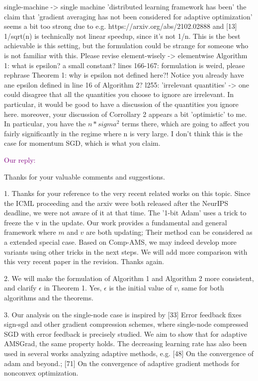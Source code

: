\documentclass{article}
\begin{document}
single-machine -> single machine
'distributed learning framework has been'
the claim that 'gradient averaging has not been considered for adaptive optimization' seems a bit too strong due to e.g. https://arxiv.org/abs/2102.02888 and [13]
1/sqrt(n) is technically not linear speedup, since it's not 1/n. This is the best achievable is this setting, but the formulation could be strange for someone who is not familiar with this. Please revise
element-wisely -> elementwise
Algorithm 1: what is epsilon? a small constant?
lines 166-167: formulation is weird, please rephrase
Theorem 1: why is epsilon not defined here?! Notice you already have ane epsilon defined in line 16 of Algorithm 2?
l255: 'irrelevant quantities' -> one could disagree that all the quantities you choose to ignore are irrelevant. In particular, it would be good to have a discussion of the quantities you ignore here.
moreover, your discussion of Corrollary 2 appears a bit 'optimistic' to me. In particular, you have the $n * sigma^2$ terms there, which are going to affect you fairly significantly in the regime where n is very large. I don't think this is the case for momentum SGD, which is what you claim.


\textcolor{purple}{Our reply:}

Thanks for your valuable comments and suggestions.

1. Thanks for your reference to the very recent related works on this topic. Since the ICML proceeding and the arxiv were both released after the NeurIPS deadline, we were not aware of it at that time. The '1-bit Adam' uses a trick to freeze the v in the update. Our work provides a fundamental and general framework where $m$ and $v$ are both updating; Their method can be considered as a extended special case. 
Based on Comp-AMS, we may indeed develop more variants using other tricks in the next steps. We will add more comparison with this very recent paper in the revision. Thanks again.

2. We will make the formulation of Algorithm 1 and Algorithm 2 more consistent, and clarify $\epsilon$ in Theorem 1. Yes, $\epsilon$ is the initial value of $v$, same for both algorithms and the theorems. 

3. Our analysis on the single-node case is inspired by [33] Error feedback fixes sign-sgd and other gradient compression schemes, where single-node compressed SGD with error feedback is precisely studied. We aim to show that for adaptive AMSGrad, the same property holds. 
The decreasing learning rate has also been used in several works analyzing adaptive methods, e.g. [48] On the convergence of adam and beyond.; [71] On the convergence of adaptive gradient methods for nonconvex optimization.
\end{document}
